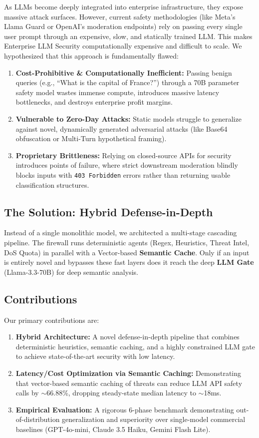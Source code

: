 \documentclass[12pt,a4paper]{article}
\begin{document}
As LLMs become deeply integrated into enterprise infrastructure, they expose massive attack surfaces. However, current safety methodologies (like Meta's Llama Guard or OpenAI's moderation endpoints) rely on passing every single user prompt through an expensive, slow, and statically trained LLM. This makes Enterprise LLM Security computationally expensive and difficult to scale. We hypothesized that this approach is fundamentally flawed:

\begin{enumerate}
    \item \textbf{Cost-Prohibitive \& Computationally Inefficient:} Passing benign queries (e.g., ``What is the capital of France?'') through a 70B parameter safety model wastes immense compute, introduces massive latency bottlenecks, and destroys enterprise profit margins.
    \item \textbf{Vulnerable to Zero-Day Attacks:} Static models struggle to generalize against novel, dynamically generated adversarial attacks (like Base64 obfuscation or Multi-Turn hypothetical framing).
    \item \textbf{Proprietary Brittleness:} Relying on closed-source APIs for security introduces points of failure, where strict downstream moderation blindly blocks inputs with \texttt{403 Forbidden} errors rather than returning usable classification structures.
\end{enumerate}

\subsection{The Solution: Hybrid Defense-in-Depth}

Instead of a single monolithic model, we architected a multi-stage cascading pipeline. The firewall runs deterministic agents (Regex, Heuristics, Threat Intel, DoS Quota) in parallel with a Vector-based \textbf{Semantic Cache}. Only if an input is entirely novel and bypasses these fast layers does it reach the deep \textbf{LLM Gate} (Llama-3.3-70B) for deep semantic analysis.

\subsection{Contributions}
Our primary contributions are:
\begin{enumerate}
    \item \textbf{Hybrid Architecture:} A novel defense-in-depth pipeline that combines deterministic heuristics, semantic caching, and a highly constrained LLM gate to achieve state-of-the-art security with low latency.
    \item \textbf{Latency/Cost Optimization via Semantic Caching:} Demonstrating that vector-based semantic caching of threats can reduce LLM API safety calls by $\sim$66.88\%, dropping steady-state median latency to $\sim$18ms.
    \item \textbf{Empirical Evaluation:} A rigorous 6-phase benchmark demonstrating out-of-distribution generalization and superiority over single-model commercial baselines (GPT-4o-mini, Claude 3.5 Haiku, Gemini Flash Lite).
\end{enumerate}
\end{document}
